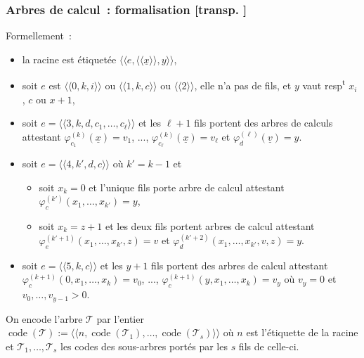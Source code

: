 \documentclass[mathserif,a4paper,aspectratio=169]{beamer}
\newcommand{\dbllangle}{\mathopen{\langle\!\langle}}
\newcommand{\dblrangle}{\mathclose{\rangle\!\rangle}}
\renewcommand{\frametitle}[1]{\subsubsection*{#1 {\footnotesize[transp. \insertframenumber]}}}
\begin{document}
\begin{frame}
\frametitle{Arbres de calcul : formalisation}

Formellement :

{\footnotesize
\begin{itemize}
\item la racine est étiquetée $\dbllangle e, \dbllangle
  \underline{x}\dblrangle, y\dblrangle$,
\item soit $e$ est $\dbllangle 0, k, i\dblrangle$ ou $\dbllangle 1, k,
  c\dblrangle$ ou $\dbllangle 2\dblrangle$, elle n'a pas de
  fils, et $y$ vaut resp\textsuperscript{t} $x_i$, $c$ ou $x+1$,
\item soit $e = \dbllangle 3, k, d, c_1,\ldots,c_\ell\dblrangle$ et
  les $\ell+1$ fils portent des arbres de calculs attestant
  $\varphi_{c_1}^{(k)}(\underline{x})=v_1$, ...,
  $\varphi_{c_\ell}^{(k)}(\underline{x})=v_\ell$ et
  $\varphi_d^{(\ell)}(\underline{v})=y$.
\item soit $e = \dbllangle 4, k', d, c\dblrangle$ où $k'=k-1$ et
\begin{itemize}\footnotesize
\item soit $x_k = 0$ et l'unique fils porte arbre de calcul attestant
  $\varphi_{c}^{(k')}(x_1,\ldots,x_{k'})=y$,
\item soit $x_k = z+1$ et les deux fils portent arbres de calcul
  attestant $\varphi_{e}^{(k'+1)}(x_1,\ldots,x_{k'},z)=v$ et
  $\varphi_{d}^{(k'+2)}(x_1,\ldots,x_{k'},v,z)=y$.
\end{itemize}
\item soit $e = \dbllangle 5, k, c\dblrangle$ et les $y+1$ fils portent des
  arbres de calcul attestant $\varphi_{c}^{(k+1)}(0,x_1,\ldots,x_k)=v_0$,
  ..., $\varphi_{c}^{(k+1)}(y,x_1,\ldots,x_k)=v_y$ où $v_y=0$ et
  $v_0,\ldots,v_{y-1} > 0$.
\end{itemize}
\par}

On encode l'arbre $\mathscr{T}$ par l'entier
$\operatorname{code}(\mathscr{T}) := \dbllangle n,
\operatorname{code}(\mathscr{T}_1), \ldots,
\operatorname{code}(\mathscr{T}_s)\dblrangle$ où $n$ est l'étiquette
de la racine et $\mathscr{T}_1,\ldots,\mathscr{T}_s$ les codes des
sous-arbres portés par les $s$ fils de celle-ci.

\end{frame}
%
\end{document}
